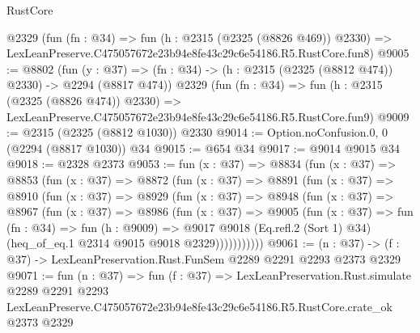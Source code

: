 \begin{lexlean}{RustCore}
\begin{coremodule}
    @2329
    (fun (fn : @34) =>
    fun (h : @2315 (@2325 (@8826 @469)) @2330) =>
    LexLeanPreserve.C475057672e23b94e8fe43c29c6e54186.R5.RustCore.fun8)
@9005 := @8802
    (fun (y : @37) => (fn : @34) -> (h : @2315 (@2325 (@8812 @474)) @2330) -> @2294 (@8817 @474))
    @2329
    (fun (fn : @34) =>
    fun (h : @2315 (@2325 (@8826 @474)) @2330) =>
    LexLeanPreserve.C475057672e23b94e8fe43c29c6e54186.R5.RustCore.fun9)
@9009 := @2315 (@2325 (@8812 @1030)) @2330
@9014 := Option.noConfusion.{0, 0} (@2294 (@8817 @1030)) @34
@9015 := @654 @34
@9017 := @9014 @9015 @34
@9018 := @2328 @2373
@9053 := fun (x : @37) =>
  @8834
    (fun (x : @37) =>
    @8853
      (fun (x : @37) =>
      @8872
        (fun (x : @37) =>
        @8891
          (fun (x : @37) =>
          @8910
            (fun (x : @37) =>
            @8929
              (fun (x : @37) =>
              @8948
                (fun (x : @37) =>
                @8967
                  (fun (x : @37) =>
                  @8986
                    (fun (x : @37) =>
                    @9005
                      (fun (x : @37) =>
                      fun (fn : @34) =>
                      fun (h : @9009) =>
                      @9017
                        @9018
                        (Eq.refl.{2} (Sort 1) @34)
                        (heq_of_eq.{1} @2314 @9015 @9018 @2329)))))))))))
@9061 := (n : @37) -> (f : @37) -> LexLeanPreservation.Rust.FunSem @2289 @2291 @2293 @2373 @2329
@9071 := fun (n : @37) =>
  fun (f : @37) =>
  LexLeanPreservation.Rust.simulate
    @2289
    @2291
    @2293
    LexLeanPreserve.C475057672e23b94e8fe43c29c6e54186.R5.RustCore.crate_ok
    @2373
    @2329
\end{coremodule}
\end{lexlean}
